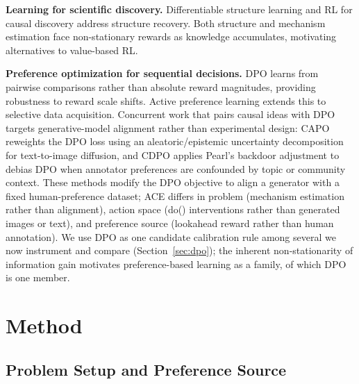 \documentclass{article}
\theoremstyle{plain}
\theoremstyle{definition}
\theoremstyle{remark}
\begin{document}
\textbf{Learning for scientific discovery.} Differentiable structure learning \citep{lorch2021dibs} and RL for causal discovery \citep{core2024,gacbo2024} address structure recovery. Both structure and mechanism estimation face non-stationary rewards as knowledge accumulates, motivating alternatives to value-based RL.

\textbf{Preference optimization for sequential decisions.} DPO \citep{rafailov2023direct} learns from pairwise comparisons rather than absolute reward magnitudes, providing robustness to reward scale shifts. Active preference learning \citep{activedpo2024} extends this to selective data acquisition. Concurrent work that pairs causal ideas with DPO targets generative-model alignment rather than experimental design: CAPO \citep{hu2026capo} reweights the DPO loss using an aleatoric/epistemic uncertainty decomposition for text-to-image diffusion, and CDPO \citep{le2026cdpo} applies Pearl's backdoor adjustment to debias DPO when annotator preferences are confounded by topic or community context. These methods modify the DPO objective to align a generator with a fixed human-preference dataset; ACE differs in problem (mechanism estimation rather than alignment), action space (do() interventions rather than generated images or text), and preference source (lookahead reward rather than human annotation). We use DPO as one candidate calibration rule among several we now instrument and compare (Section~\ref{sec:dpo}); the inherent non-stationarity of information gain motivates preference-based learning as a family, of which DPO is one member.

\section{Method}
\label{sec:methods}

\subsection{Problem Setup and Preference Source}
\label{sec:problem}
\end{document}
